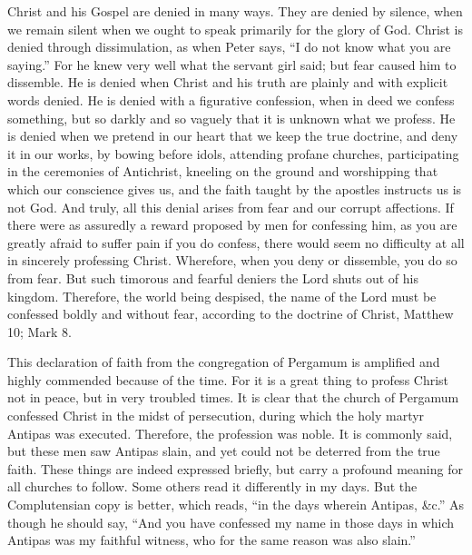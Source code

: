 Christ and his Gospel are denied in many ways. They are denied by silence, when we remain silent when we ought to speak primarily for the glory of God. Christ is denied through dissimulation, as when Peter says, “I do not know what you are saying.” For he knew very well what the servant girl said; but fear caused him to dissemble. He is denied when Christ and his truth are plainly and with explicit words denied. He is denied with a figurative confession, when in deed we confess something, but so darkly and so vaguely that it is unknown what we profess. He is denied when we pretend in our heart that we keep the true doctrine, and deny it in our works, by bowing before idols, attending profane churches, participating in the ceremonies of Antichrist, kneeling on the ground and worshipping that which our conscience gives us, and the faith taught by the apostles instructs us is not God. And truly, all this denial arises from fear and our corrupt affections. If there were as assuredly a reward proposed by men for confessing him, as you are greatly afraid to suffer pain if you do confess, there would seem no difficulty at all in sincerely professing Christ. Wherefore, when you deny or dissemble, you do so from fear. But such timorous and fearful deniers the Lord shuts out of his kingdom. Therefore, the world being despised, the name of the Lord must be confessed boldly and without fear, according to the doctrine of Christ, Matthew 10; Mark 8.

This declaration of faith from the congregation of Pergamum is amplified and highly commended because of the time. For it is a great thing to profess Christ not in peace, but in very troubled times. It is clear that the church of Pergamum confessed Christ in the midst of persecution, during which the holy martyr Antipas was executed. Therefore, the profession was noble. It is commonly said, but these men saw Antipas slain, and yet could not be deterred from the true faith. These things are indeed expressed briefly, but carry a profound meaning for all churches to follow. Some others read it differently in my days. But the Complutensian copy is better, which reads, “in the days wherein Antipas, \&c.” As though he should say, “And you have confessed my name in those days in which Antipas was my faithful witness, who for the same reason was also slain.”

